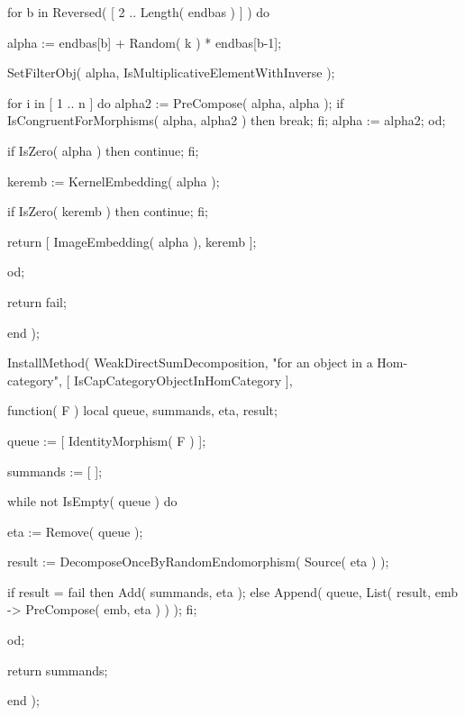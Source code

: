     for b in Reversed( [ 2 .. Length( endbas ) ] ) do
        
        alpha := endbas[b] + Random( k ) * endbas[b-1];
        
        SetFilterObj( alpha, IsMultiplicativeElementWithInverse );
        
        for i in [ 1 .. n ] do
            alpha2 := PreCompose( alpha, alpha );
            if IsCongruentForMorphisms( alpha, alpha2 ) then
                break;
            fi;
            alpha := alpha2;
        od;
        
        if IsZero( alpha ) then
            continue;
        fi;
        
        keremb := KernelEmbedding( alpha );
        
        if IsZero( keremb ) then
            continue;
        fi;
        
        return [ ImageEmbedding( alpha ), keremb ];
        
    od;
    
    return fail;
    
end );


InstallMethod( WeakDirectSumDecomposition,
        "for an object in a Hom-category",
        [ IsCapCategoryObjectInHomCategory ],
        
  function( F )
    local queue, summands, eta, result;
    
    queue := [ IdentityMorphism( F ) ];
    
    summands := [ ];
    
    while not IsEmpty( queue ) do
        
        eta := Remove( queue );
        
        result := DecomposeOnceByRandomEndomorphism( Source( eta ) );
        
        if result = fail then
            Add( summands, eta );
        else
            Append( queue, List( result, emb -> PreCompose( emb, eta ) ) );
        fi;
        
    od;
    
    return summands;
    
end );



















